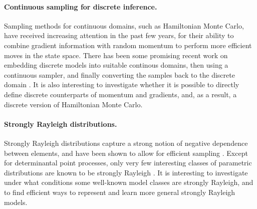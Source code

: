 \paragraph{Continuous sampling for discrete inference.}
Sampling methods for continuous domains, such as Hamiltonian Monte Carlo, have received increasing attention in the past few years, for their ability to combine gradient information with random momentum to perform more efficient moves in the state space.
There has been some promising recent work on embedding discrete models into suitable continous domains, then using a continuous sampler, and finally converting the samples back to the discrete domain \citep{zhang12,pakman13,dinh17,nishimura18}.
It is also interesting to investigate whether it is possible to directly define discrete counterparts of momentum and gradients, and, as a result, a discrete version of Hamiltonian Monte Carlo.

\paragraph{Strongly Rayleigh distributions.}
Strongly Rayleigh distributions \citep{borcea08} capture a strong notion of negative dependence between elements, and have been shown to allow for efficient sampling \citep{anari16,li16}.
Except for determinantal point processes, only very few interesting classes of parametric distributions are known to be strongly Rayleigh \citep{li17}.
It is interesting to investigate under what conditions some well-known model classes are strongly Rayleigh, and to find efficient ways to represent and learn more general strongly Rayleigh models.